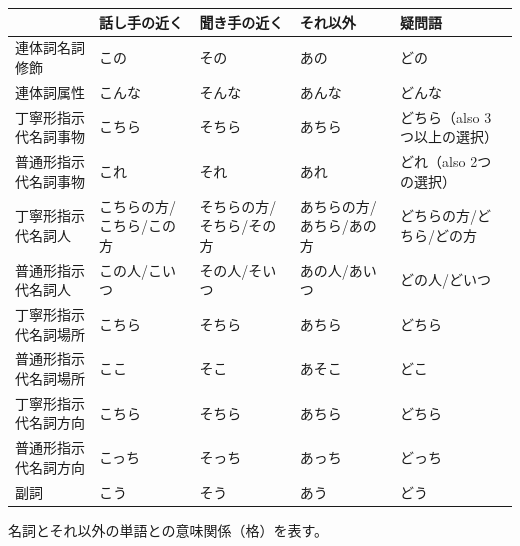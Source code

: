 \documentclass[a4paper,12pt]{article}
\begin{document}
\begin{longtable}[c]{|C{0.16\textwidth}|C{0.16\textwidth}|C{0.16\textwidth}|C{0.16\textwidth}|C{0.16\textwidth}|}
\hline
 & 話し手の近く & 聞き手の近く & それ以外 & 疑問語 \\\hline
連体詞名詞修飾 & この & その & あの & どの \\\hline
連体詞属性 & こんな & そんな & あんな & どんな \\\hline
丁寧形指示代名詞事物 & こちら & そちら & あちら & どちら（also 3つ以上の選択） \\\hline
普通形指示代名詞事物 & これ & それ & あれ & どれ（also 2つの選択） \\\hline
丁寧形指示代名詞人 & こちらの方/こちら/この方 & そちらの方/そちら/その方 & あちらの方/あちら/あの方 & どちらの方/どちら/どの方 \\\hline
普通形指示代名詞人 & この人/こいつ & その人/そいつ & あの人/あいつ & どの人/どいつ \\\hline
丁寧形指示代名詞場所 & こちら & そちら & あちら & どちら \\\hline
普通形指示代名詞場所 & ここ & そこ & あそこ & どこ \\\hline
丁寧形指示代名詞方向 & こちら & そちら & あちら & どちら \\\hline
普通形指示代名詞方向 & こっち & そっち & あっち & どっち \\\hline
副詞 & こう & そう & あう & どう \\\hline
\end{longtable}
名詞とそれ以外の単語との意味関係（格）を表す。
\end{document}
